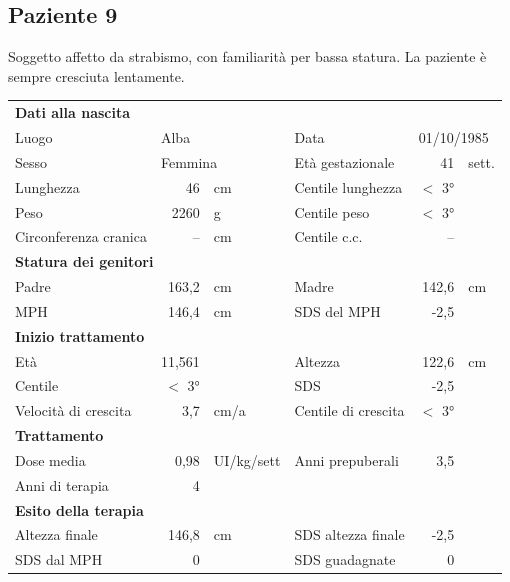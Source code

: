 \subsection*{Paziente 9}%


Soggetto affetto da strabismo, con familiarità per bassa statura. La paziente è sempre cresciuta lentamente.


\begin{table}[!h]
\begin{tabular}{lrllrl}
\toprule
\multicolumn{6}{l}{\textbf{Dati alla nascita}}\\
Luogo 		& \multicolumn{2}{l}{Alba} 	& Data 					& \multicolumn{2}{l}{01/10/1985} 	\\
Sesso 		& \multicolumn{2}{l}{Femmina} 	& Età gestazionale 		& 41 		& sett.\\
Lunghezza 	& 46 		& cm 				& Centile lunghezza		& $<$ 3° 		\\
Peso 		& 2260 		& g					& Centile peso			& $<$ 3° 		\\
Circonferenza cranica	& -- 		& cm 	& Centile c.c.			& -- \\
\midrule
\multicolumn{6}{l}{\textbf{Statura dei genitori}}\\
Padre 		& 163,2 & cm 	& Madre 				& 142,6 & cm \\
MPH 		& 146,4 & cm 	& SDS del MPH 			& -2,5\\
\midrule
\multicolumn{6}{l}{\textbf{Inizio trattamento}} \\
Età	& 11,561 & 		& Altezza 				& 122,6 & cm  \\
Centile & $<$ 3° 	 &		& SDS		& -2,5 \\
Velocità di crescita & 3,7 & cm/a	& Centile di crescita & $<$ 3°\\
\midrule
\multicolumn{6}{l}{\textbf{Trattamento}} \\
Dose media		& 0,98 & UI/kg/sett & Anni prepuberali & 3,5\\
Anni di terapia & 4\\
\midrule
\multicolumn{6}{l}{\textbf{Esito della terapia}} \\
Altezza finale			& 146,8 & cm 	& SDS altezza finale		& -2,5\\
SDS dal MPH				& 0 &		& SDS guadagnate 			& 0\\
\bottomrule
\end{tabular}
\end{table}
\clearpage


